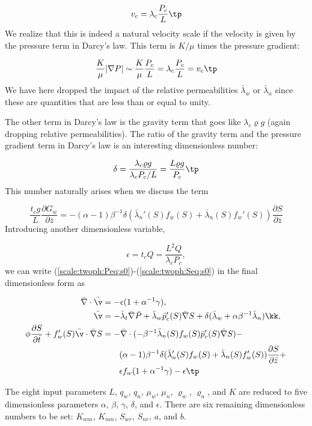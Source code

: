 \documentclass[graybox,envcountchap,sectrefs,final]{svmonodo}
\begin{document}
\[ v_c = \lambda_c\frac{P_c}{L}\tp\]
We realize that this is indeed a natural velocity scale if the
velocity is given by the pressure term in Darcy's law. This term
is $K/\mu$ times the pressure gradient:

\[ \frac{K}{\mu}|\nabla P| \sim \frac{K}{\mu}\frac{P_c}{L} =
\lambda_c\frac{P_c}{L} = v_c\tp\]
We have here dropped the impact of the
relative permeabilities $\bar\lambda_w$ or
$\bar\lambda_n$ since these are quantities that are less than or equal
to unity.

The other term in Darcy's law is the gravity term that goes like
$\lambda_c \varrho g$ (again dropping relative permeabilities).
The ratio of the gravity term and the pressure gradient term in Darcy's
law is an interesting dimensionless number:

\[ \delta = \frac{\lambda_c \varrho g}{\lambda_c P_c/L} =
\frac{L\varrho g}{P_c}\tp\]
This number naturally arises when we discuss
the term

\[ \frac{t_c g}{L}\frac{\partial G_w}{\partial\bar z} =
-(\alpha -1)\beta^{-1}\delta
(\bar\lambda_n'(S)f_w(S) + \bar\lambda_n(S)f_w'(S))
\frac{\partial S}{\partial\bar z}
\]
Introducing another dimensionless variable,

\[ \epsilon = t_cQ = \frac{L^2Q}{\lambda_cP_c},\]
we can write (\ref{scale:twoph:Peq:s0})-(\ref{scale:twoph:Seq:s0}) in the
final dimensionless form as

\begin{align}
\bar\nabla\cdot\bar\v &= -\epsilon(1 + \alpha^{-1}\gamma),
\label{scale:twoph:Peq:s}\\ 
\bar\v &= -\bar\lambda_t\bar\nabla\bar P +
\bar\lambda_w \bar p_c'(S)\bar\nabla S +
\delta(\bar\lambda_w + \alpha\beta^{-1}\bar\lambda_n)\kk,
\label{scale:twoph:v_teq:s}\\ 
\phi\frac{\partial S}{\partial\bar t} + f_w'(S)\bar\v\cdot
\bar\nabla S &= -
\bar\nabla\cdot(-\beta^{-1}\bar\lambda_n(S)f_w(S)\bar p_c'(S)\bar\nabla S) -
\nonumber\\ 
&\quad\quad (\alpha -1)\beta^{-1}\delta
(\bar\lambda_n'(S)f_w(S) + \bar\lambda_n(S)f_w'(S))
\frac{\partial S}{\partial\bar z} +\nonumber\\ 
&\quad\quad\epsilon f_w (1+\alpha^{-1}\gamma) -
\epsilon\tp
\label{scale:twoph:Seq:s}
\end{align}

The eight input parameters $L$, $q_w$, $q_n$, $\mu_w$, $\mu_n$,
$\varrho_w$, $\varrho_n$, and $K$ are reduced to five dimensionless
parameters $\alpha$, $\beta$, $\gamma$, $\delta$, and $\epsilon$.
There are six remaining dimensionless numbers to be set: $K_{wm}$,
$K_{nm}$, $S_{wr}$, $S_{nr}$, $a$, and $b$.
\end{document}

